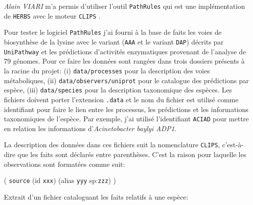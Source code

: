 \begin{refsegment}
\textit{Alain VIARI} m'a permis d'utiliser l'outil \texttt{PathRules} qui est une implémentation de \texttt{\gls{HERBS}} avec le moteur \texttt{\gls{CLIPS}} \cite{riley1991clips}.


Pour tester le logiciel \texttt{PathRules} j'ai fourni à la base de faits les voies de biosynthèse de la lysine avec le variant (\texttt{AAA} et le variant \texttt{DAP}) décrits par \texttt{UniPathway} et les prédictions d’activités enzymatiques provenant de l’analyse de 79 génomes. Pour ce faire les données sont rangées dans trois dossiers présents à la racine du projet: (i) \texttt{data/processes} pour la description des voies métaboliques, (ii) \texttt{data/observers/uniprot} pour le catalogue des prédictions par espèce, (iii) \texttt{data/species} pour la description taxonomique des espèces. Les fichiers doivent porter l'extension \texttt{.data} et le nom du fichier est utilisé comme identifiant pour faire le lien entre les processus, les prédictions et les informations taxonomiques de l'espèce. Par exemple, j'ai utilisé l'identifiant \texttt{ACIAD} pour mettre en relation les informations d'\textit{Acinetobacter baylyi ADP1}.



La description des données dans ces fichiers suit la nomenclature \texttt{\gls{CLIPS}}, c'est-à-dire que les faits sont déclarés entre parenthèses. C'est la raison pour laquelle les observations sont formatées comme suit: 

( \texttt{source} (id \texttt{xxx}) (alias \texttt{yyy} sp:\texttt{zzz})  )

Extrait d'un fichier cataloguant les faits relatifs à une espèce:\nolisttopbreak




\end{refsegment}
